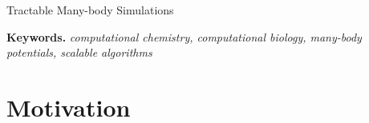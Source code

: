 \documentclass[twoside,leqno, 12pt]{article}
\date{}
\begin{document}
\begin{center}
\LARGE{Tractable Many-body Simulations} \newline
\end{center}

\textbf{Keywords.}  \textit{computational chemistry, computational biology, many-body potentials, scalable algorithms}







\section{Motivation}
\end{document}
